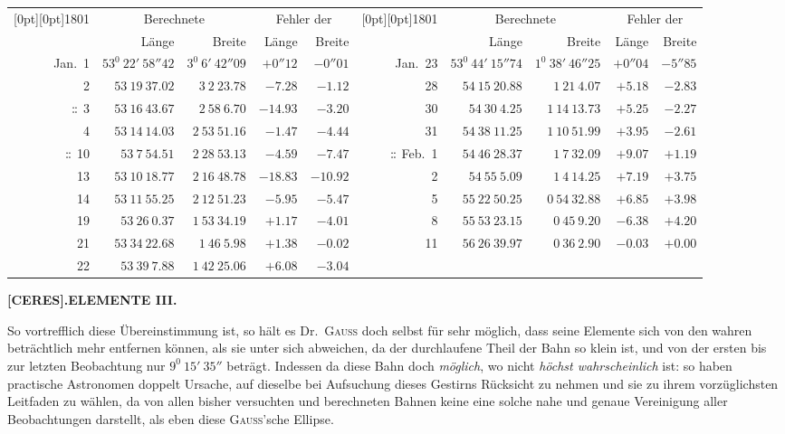 \begin{center}
{\fontsize{8}{9.6}\selectfont\setlength{\tabcolsep}{1.08pt}
\setlength{\arrayrulewidth}{.3pt}\setlength{\doublerulesep}{1pt}
\begin{tabular}{r|r|r|r|r||r|r|r|r|r}
\raisebox{-.5\baselineskip}[0pt][0pt]{1801}&\multicolumn{2}{c|}{Berechnete}&\multicolumn{2}{c||}{Fehler der}&\raisebox{-.5\baselineskip}[0pt][0pt]{1801}&\multicolumn{2}{c|}{Berechnete}&\multicolumn{2}{c}{Fehler der}\\
&Länge&Breite&Länge&Breite&&Länge&Breite&Länge&Breite\\\hline
Jan.\ 1&$53^0\ 22'\ 58''42$&$3^0\ 6'\ 42''09$&$+0''12$&$-0''01$&Jan.\ 23&$53^0\ 44'\ 15''74$&$1^0\ 38'\ 46''25$&$+0''04$&$-5''85$\\
2&$53\ 19\ 37.02$&$3\ 2\ 23.78$&$-7.28$&$-1.12$&28&$54\ 15\ 20.88$&$1\ 21\ 4.07$&$+5.18$&$-2.83$\\
$\mathord{:}\mkern-1mu\mathord{:}$ 3&$53\ 16\ 43.67$&$2\ 58\ 6.70$&$-14.93$&$-3.20$&30&$54\ 30\ 4.25$&$1\ 14\ 13.73$&$+5.25$&$-2.27$\\
4&$53\ 14\ 14.03$&$2\ 53\ 51.16$&$-1.47$&$-4.44$&31&$54\ 38\ 11.25$&$1\ 10\ 51.99$&$+3.95$&$-2.61$\\
$\mathord{:}\mkern-1mu\mathord{:}$ 10&$53\ 7\ 54.51$&$2\ 28\ 53.13$&$-4.59$&$-7.47$&$\mathord{:}\mkern-1mu\mathord{:}$ Feb.\ 1&$54\ 46\ 28.37$&$1\ 7\ 32.09$&$+9.07$&$+1.19$\\
13&$53\ 10\ 18.77$&$2\ 16\ 48.78$&$-18.83$&$-10.92$&2&$54\ 55\ 5.09$&$1\ 4\ 14.25$&$+7.19$&$+3.75$\\
14&$53\ 11\ 55.25$&$2\ 12\ 51.23$&$-5.95$&$-5.47$&5&$55\ 22\ 50.25$&$0\ 54\ 32.88$&$+6.85$&$+3.98$\\
19&$53\ 26\ 0.37$&$1\ 53\ 34.19$&$+1.17$&$-4.01$&8&$55\ 53\ 23.15$&$0\ 45\ 9.20$&$-6.38$&$+4.20$\\
21&$53\ 34\ 22.68$&$1\ 46\ 5.98$&$+1.38$&$-0.02$&11&$56\ 26\ 39.97$&$0\ 36\ 2.90$&$-0.03$&$+0.00$\\
22&$53\ 39\ 7.88$&$1\ 42\ 25.06$&$+6.08$&$-3.04$&\multicolumn{5}{l}{}
\end{tabular}}
\end{center}
\par\clearpage
\thispagestyle{empty}
\noindent{}%
\makebox[12mm][l]{}%
\parbox[t]{\dimexpr\linewidth-24mm\relax}{\centering\footnotesize\bfseries [CERES].\enspace ELEMENTE III.\par}%
\par\nobreak\medskip
\indent So vortrefflich diese Übereinstimmung ist, so hält es Dr.\ \textsc{Gauss} doch selbst für sehr möglich, dass seine Elemente sich von den wahren beträchtlich mehr entfernen können, als sie unter sich abweichen, da der durchlaufene Theil der Bahn so klein ist, und von der ersten bis zur letzten Beobachtung nur $9^0\ 15'\ 35''$ beträgt. Indessen da diese Bahn doch \textit{möglich}, wo nicht \textit{höchst wahrscheinlich} ist: so haben practische Astronomen doppelt Ursache, auf dieselbe bei Aufsuchung dieses Gestirns Rücksicht zu nehmen und sie zu ihrem vorzüglichsten Leitfaden zu wählen, da von allen bisher versuchten und berechneten Bahnen keine eine solche nahe und genaue Vereinigung aller Beobachtungen darstellt, als eben diese \textsc{Gauss}'sche Ellipse.

